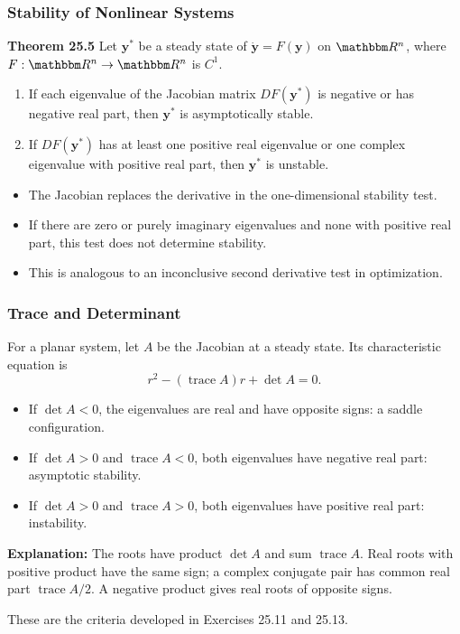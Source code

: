 \documentclass[9pt,aspectratio=169]{beamer}
\newcommand{\RR}{\mathbbm R}
\begin{document}
\begin{frame}
    \frametitle{Stability of Nonlinear Systems}
    \begin{block}{\textbf{Theorem 25.5}}
        Let $\mathbf{y}^*$ be a steady state of
        $\dot{\mathbf{y}}=F(\mathbf{y})$ on $\RR^n$, where
        $F:\RR^n\rightarrow\RR^n$ is $C^1$.
        \begin{enumerate}
            \item[(a)] If each eigenvalue of the Jacobian matrix
            $DF(\mathbf{y}^*)$ is negative or has negative real part,
            then $\mathbf{y}^*$ is asymptotically stable.
            \item[(b)] If $DF(\mathbf{y}^*)$ has at least one positive
            real eigenvalue or one complex eigenvalue with positive
            real part, then $\mathbf{y}^*$ is unstable.
        \end{enumerate}
    \end{block}
    \begin{itemize}
        \item The Jacobian replaces the derivative in the one-dimensional
        stability test.
        \item If there are zero or purely imaginary eigenvalues and none
        with positive real part, this test does not determine stability.
        \item This is analogous to an inconclusive second derivative
        test in optimization.
    \end{itemize}
\end{frame}

\begin{frame}
    \frametitle{Trace and Determinant}
    For a planar system, let $A$ be the Jacobian at a steady state.
    Its characteristic equation is
    \[
        r^2-(\operatorname{trace}A)r+\det A=0.
    \]
    \begin{itemize}
        \item If $\det A<0$, the eigenvalues are real and have opposite
        signs: a saddle configuration.
        \item If $\det A>0$ and $\operatorname{trace}A<0$, both
        eigenvalues have negative real part: asymptotic stability.
        \item If $\det A>0$ and $\operatorname{trace}A>0$, both
        eigenvalues have positive real part: instability.
    \end{itemize}
    \textbf{Explanation:} The roots have product $\det A$ and sum
    $\operatorname{trace}A$. Real roots with positive product have the
    same sign; a complex conjugate pair has common real part
    $\operatorname{trace}A/2$. A negative product gives real roots of
    opposite signs.
    \medskip

    These are the criteria developed in Exercises 25.11 and 25.13.
\end{frame}
\end{document}
